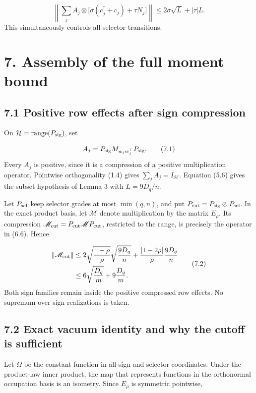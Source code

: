 \documentclass[11pt,a4paper]{article}
\begin{document}
\begin{equation}
\left\|\sum_j A_j\otimes
\big[\sigma(c_j^\dagger+c_j)+\tau N_j\big]\right\|
\le2\sigma\sqrt L+|\tau|L.
\tag{6.6}
\end{equation}
This simultaneously controls all selector transitions.

\section*{7. Assembly of the full moment bound}
\subsection*{7.1 Positive row effects after sign compression}
On \(\mathcal H=\operatorname{range}(P_{\rm sig})\), set

\begin{equation}
A_j=P_{\rm sig}M_{w_jw_j^\top}P_{\rm sig}.
\tag{7.1}
\end{equation}
Every \(A_j\) is positive, since it is a compression of a positive multiplication operator. Pointwise orthogonality (1.4) gives \(\sum_jA_j=I_{\mathcal H}\). Equation (5.6) gives the subset hypothesis of Lemma 3 with \(L=9D_q/n\).

Let \(P_{\rm sel}\) keep selector grades at most \(\min(q,n)\), and put \(P_{\rm cut}=P_{\rm sig}\otimes P_{\rm sel}\). In the exact product basis, let \(\mathscr M\) denote multiplication by the matrix \(E_\rho\). Its compression \(\mathscr M_{\rm cut}=P_{\rm cut}\mathscr M P_{\rm cut}\), restricted to the range, is precisely the operator in (6.6). Hence

\begin{equation}
\begin{aligned}
\|\mathscr M_{\rm cut}\|
&\le2\sqrt{\frac{1-\rho}{\rho}}\sqrt{\frac{9D_q}n}
 +\frac{|1-2\rho|}{\rho}\frac{9D_q}n\\
&\le6\sqrt{\frac{D_q}{m}}+9\frac{D_q}{m}.
\end{aligned}
\tag{7.2}
\end{equation}
Both sign families remain inside the positive compressed row effects. No supremum over sign realizations is taken.

\subsection*{7.2 Exact vacuum identity and why the cutoff is sufficient}
Let \(\Omega\) be the constant function in all sign and selector coordinates. Under the product-law inner product, the map that represents functions in the orthonormal occupation basis is an isometry. Since \(E_\rho\) is symmetric pointwise,
\end{document}
